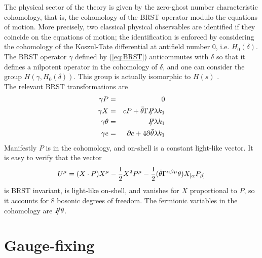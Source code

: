 \documentclass[a4paper,12pt]{article}
\begin{document}
The physical sector of the theory is given by the zero-ghost number
characteristic cohomology, that is, the cohomology of the BRST operator 
modulo the equations of motion. More precisely, two classical physical
observables are identified if they coincide on the equations of
motion; the identification is enforced by considering the cohomology
of the Koszul-Tate differential at antifield number 0, i.e. $H_0(\delta)$.
The BRST operator $\gamma$ defined by (\ref{eq:BRST}) anticommutes
with $\delta$ so that it defines a nilpotent operator in the
cohomology of $\delta$, and one can consider the group
$H(\gamma,H_0(\delta))$. This group is actually isomorphic to $H(s)$   
\cite{barnich}. \\
The relevant BRST transformations are
\begin{eqnarray}
 \gamma P &=& 0 \nonumber \\
 \gamma X &=& cP + \bar\theta \Gamma \SL{P} \lambda k_1 \nonumber \\
 \gamma \theta &=& \SL{P} \lambda k_1 \nonumber \\
 \gamma e &=& \partial c + 4 \partial \bar\theta \lambda k_1 
\end{eqnarray}
Manifestly $P$ is in the cohomology, and on-shell is a
constant light-like vector. It is easy to verify that the vector 
\begin{displaymath}
  U^\mu = (X \cdot P) X^\mu - {1\over 2} X^2 P^\mu - {1 \over 2}
  (\bar\theta \Gamma^{\alpha\beta\mu} \theta)X_{[\alpha}P_{\beta]}
\end{displaymath}
is BRST invariant, is light-like on-shell, and vanishes for $X$
proportional to $P$, so it accounts for 8 bosonic degrees of
freedom. The fermionic variables in the cohomology are $\SL{P}
\theta$.


\section{Gauge-fixing}
\label{sec:gauge}
\end{document}
